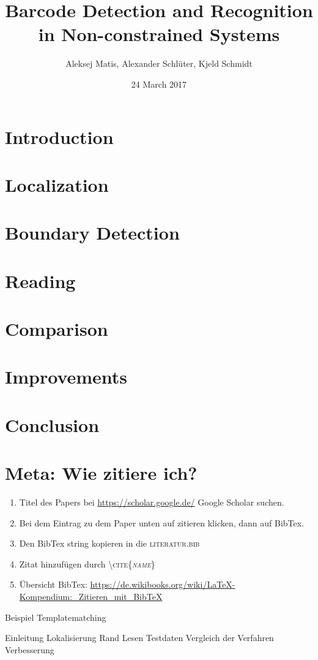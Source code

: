 \documentclass[12pt,a4paper]{article}
\author{Aleksej Matis, Alexander Schlüter, Kjeld Schmidt}
\title{Barcode Detection and Recognition in Non-constrained Systems}
\date{24 March 2017}
\begin{document}

\setcounter{page}{0}
\maketitle
\thispagestyle{empty} 
\tableofcontents
\newpage
\section{Introduction} 

\newpage

\section{Localization}\label{sec:Localization}

\newpage

\section{Boundary Detection} 

\newpage

\section{Reading}\label{sec:Reading}
 
\newpage

\section{Comparison} 

\newpage

\section{Improvements} 

\newpage

\section{Conclusion} 

\newpage


\section{Meta: Wie zitiere ich?} 
\begin{enumerate}
\item Titel des Papers bei \url{https://scholar.google.de/} Google Scholar suchen.
\item Bei dem Eintrag zu dem Paper unten auf zitieren klicken, dann auf BibTex.
\item Den BibTex string kopieren in die \textsc{literatur.bib}
\item Zitat hinzufügen durch \textsc{\textbackslash cite\{\textit{name}\}}
\item Übersicht BibTex: \url{https://de.wikibooks.org/wiki/LaTeX-Kompendium:_Zitieren_mit_BibTeX}
\end{enumerate}
Beispiel Templatematching \cite{chen2014scanning}
%

Einleitung
Lokalisierung
Rand
Lesen
Testdaten
Vergleich der Verfahren
Verbesserung



%

\newpage
\appendix
\printbibliography
\end{document}
